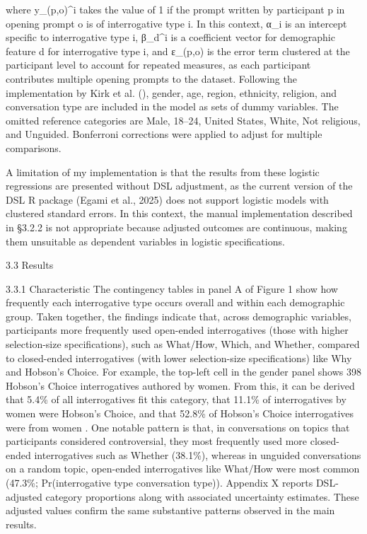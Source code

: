 \documentclass[
  12pt,
]{article}
\begin{document}
where y\_(p,o)\^{}i takes the value of 1 if the prompt written by participant p in opening prompt o is of interrogative type i. In this context, α\_i is an intercept specific to interrogative type i, β\_d\^{}i is a coefficient vector for demographic feature d for interrogative type i, and ε\_(p,o) is the error term clustered at the participant level to account for repeated measures, as each participant contributes multiple opening prompts to the dataset. Following the implementation by Kirk et al. (), gender, age, region, ethnicity, religion, and conversation type are included in the model as sets of dummy variables. The omitted reference categories are Male, 18--24, United States, White, Not religious, and Unguided. Bonferroni corrections were applied to adjust for multiple comparisons.

A limitation of my implementation is that the results from these logistic regressions are presented without DSL adjustment, as the current version of the DSL R package (Egami et al., 2025) does not support logistic models with clustered standard errors. In this context, the manual implementation described in §3.2.2 is not appropriate because adjusted outcomes are continuous, making them unsuitable as dependent variables in logistic specifications.

3.3 Results

3.3.1 Characteristic
The contingency tables in panel A of Figure 1 show how frequently each interrogative type occurs overall and within each demographic group. Taken together, the findings indicate that, across demographic variables, participants more frequently used open-ended interrogatives (those with higher selection-size specifications), such as What/How, Which, and Whether, compared to closed-ended interrogatives (with lower selection-size specifications) like Why and Hobson's Choice. For example, the top-left cell in the gender panel shows 398 Hobson's Choice interrogatives authored by women. From this, it can be derived that 5.4\% of all interrogatives fit this category, that 11.1\% of interrogatives by women were Hobson's Choice, and that 52.8\% of Hobson's Choice interrogatives were from women . One notable pattern is that, in conversations on topics that participants considered controversial, they most frequently used more closed-ended interrogatives such as Whether (38.1\%), whereas in unguided conversations on a random topic, open-ended interrogatives like What/How were most common (47.3\%; Pr(interrogative type \textbar{} conversation type)). Appendix X reports DSL-adjusted category proportions along with associated uncertainty estimates. These adjusted values confirm the same substantive patterns observed in the main results.
\end{document}
